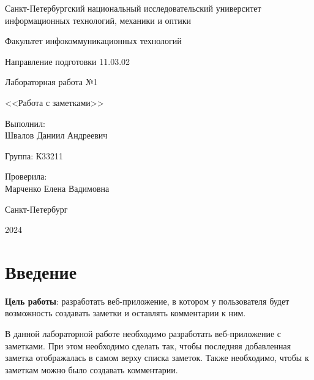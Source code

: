 \documentclass[a4paper, 14pt]{extarticle}
\begin{document}
\begin{titlepage}
  \vspace{0pt plus2fill}
  \noindent

  \vspace{0pt plus6fill}
  \begin{center}
    Санкт-Петербургский национальный исследовательский университет
    информационных технологий, механики и оптики

    \vspace{0pt plus3fill}

    Факультет инфокоммуникационных технологий

    Направление подготовки 11.03.02

    \vspace{0pt plus2fill}

    Лабораторная работа №1

    <<Работа с заметками>>

  \end{center}

  \vspace{0pt plus6fill}
  \begin{flushright}
    Выполнил: \\
    Швалов Даниил Андреевич

    Группа: К33211

    Проверила: \\
    Марченко Елена Вадимовна
  \end{flushright}

  \vspace{0pt plus5fill}
  \begin{center}
    Санкт-Петербург

    2024
  \end{center}
\end{titlepage}

\section{Введение}

\textbf{Цель работы}: разработать веб-приложение, в котором у пользователя будет
возможность создавать заметки и оставлять комментарии к ним.

В данной лабораторной работе необходимо разработать веб-приложение с заметками.
При этом необходимо сделать так, чтобы последняя добавленная заметка
отображалась в самом верху списка заметок. Также необходимо, чтобы к заметкам
можно было создавать комментарии.
\end{document}
